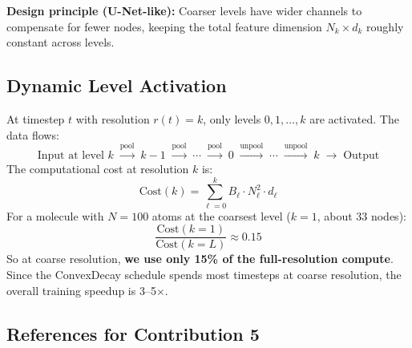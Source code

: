 \documentclass[12pt,a4paper]{article}
\begin{document}
\textbf{Design principle (U-Net-like):} Coarser levels have wider channels to compensate for fewer nodes, keeping the total feature dimension $N_k \times d_k$ roughly constant across levels.

\subsection{Dynamic Level Activation}

At timestep $t$ with resolution $r(t) = k$, only levels $0, 1, \ldots, k$ are activated. The data flows:
\[
\text{Input at level } k \;\xrightarrow{\text{pool}}\; k-1 \;\xrightarrow{\text{pool}}\; \cdots \;\xrightarrow{\text{pool}}\; 0 \;\xrightarrow{\text{unpool}}\; \cdots \;\xrightarrow{\text{unpool}}\; k \;\to\; \text{Output}
\]
The computational cost at resolution $k$ is:
\[
\text{Cost}(k) = \sum_{\ell=0}^{k} B_\ell \cdot N_\ell^2 \cdot d_\ell
\]
For a molecule with $N = 100$ atoms at the coarsest level ($k=1$, about 33 nodes):
\[
\frac{\text{Cost}(k=1)}{\text{Cost}(k=L)} \approx 0.15
\]
So at coarse resolution, \textbf{we use only 15\% of the full-resolution compute}. Since the ConvexDecay schedule spends most timesteps at coarse resolution, the overall training speedup is 3--5$\times$.

\subsection{References for Contribution 5}
\end{document}
